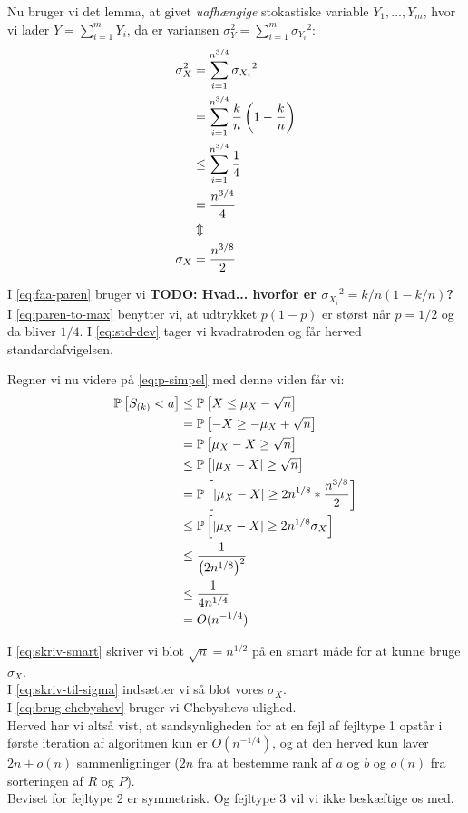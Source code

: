 Nu bruger vi det lemma, at givet \emph{uafhængige} stokastiske variable $Y_1, ..., Y_m$, hvor vi lader $Y = \sum_{i=1}^m Y_i$, da er variansen $\sigma_Y^2 = \sum_{i=1}^m {\sigma_{Y_i}}^2$:
\begin{align}
  \sigma_X^2 &= \sum_{i=1}^{n^{3/4}} {\sigma_{X_i}}^2 \nonumber \\
  &= \sum_{i=1}^{n^{3/4}} \frac{k}{n} \left(  1 - \frac{k}{n}  \right) \label{eq:faa-paren} \\
  &\leq \sum_{i=1}^{n^{3/4}} \frac{1}{4} \label{eq:paren-to-max} \\
  &= \frac{n^{3/4}}{4} \nonumber \\
  &\Updownarrow \nonumber \\
  \sigma_X &= \frac{n^{3/8}}{2} \label{eq:std-dev}
\end{align}

I \cref{eq:faa-paren} bruger vi \textbf{TODO: Hvad... hvorfor er ${\sigma_{X_i}}^2 = k/n(1 - k/n)$?}\\
I \cref{eq:paren-to-max} benytter vi, at udtrykket $p(1 - p)$ er størst når $p = 1/2$ og da bliver $1/4$.
I \cref{eq:std-dev} tager vi kvadratroden og får herved standardafvigelsen.

Regner vi nu videre på \cref{eq:p-simpel} med denne viden får vi:
\begin{align}
  \mathbb{P} \left[  S_{(k)} < a  \right] &\leq \mathbb{P} \left[  X \leq \mu_X - \sqrt{n}  \right] \nonumber \\
  &= \mathbb{P} \left[  -X \geq -\mu_X + \sqrt{n}  \right] \nonumber \\
  &= \mathbb{P} \left[  \mu_X - X \geq \sqrt{n}  \right] \nonumber \\
  &\leq \mathbb{P} \left[  |\mu_X - X| \geq \sqrt{n}  \right]  \nonumber \\
  &= \mathbb{P} \left[  |\mu_X - X| \geq 2n^{1/8} * \frac{n^{3/8}}{2}    \right] \label{eq:skriv-smart} \\
  &\leq \mathbb{P} \left[   |\mu_X - X| \geq 2n^{1/8} \sigma_X   \right] \label{eq:skriv-til-sigma} \\
  &\leq \frac{1}{\left( 2n^{1/8} \right)^2} \label{eq:brug-chebyshev} \\
  &\leq \frac{1}{4n^{1/4}} \nonumber \\
  &= O(n^{-1/4}) \nonumber
\end{align}

I \cref{eq:skriv-smart} skriver vi blot $\sqrt{n} = n^{1/2}$ på en smart måde for at kunne bruge $\sigma_X$.\\
I \cref{eq:skriv-til-sigma} indsætter vi så blot vores $\sigma_X$.\\
I \cref{eq:brug-chebyshev} bruger vi Chebyshevs ulighed.\\

Herved har vi altså vist, at sandsynligheden for at en fejl af fejltype 1 opstår i første iteration af algoritmen kun er $O(n^{-1/4})$, og at den herved kun laver $2n + o(n)$ sammenligninger ($2n$ fra at bestemme rank af $a$ og $b$ og $o(n)$ fra sorteringen af $R$ og $P$).\\

Beviset for fejltype 2 er symmetrisk. Og fejltype 3 vil vi ikke beskæftige os med.
